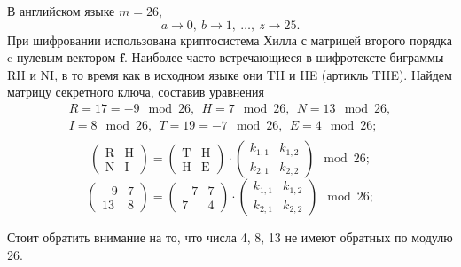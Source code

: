 \example В английском языке $m = 26$,
    \[ a \rightarrow 0, ~ b \rightarrow 1, ~ \dots, ~ z \rightarrow 25. \]
При шифровании использована криптосистема Хилла с матрицей второго порядка c нулевым вектором $\mathbf{f}$. Наиболее часто встречающиеся в шифротексте биграммы -- RH и NI, в то время как в исходном языке они TH и HE (артикль THE). Найдем матрицу секретного ключа, составив уравнения
\[
    \begin{array}{l}
        R = 17 = -9 \mod 26, ~~ H = 7 \mod 26, ~~ N = 13 \mod 26, \\
        I = 8 \mod 26, ~~ T = 19 = -7 \mod 26, ~~ E=4 \mod 26; \\
    \end{array}
\] \[
    \left( \begin{array}{cc}
        \text{R} & \text{H} \\
        \text{N} & \text{I}
    \end{array} \right) =
    \left( \begin{array}{cc}
        \text{T} & \text{H} \\
        \text{H} & \text{E}
    \end{array} \right) \cdot
    \left( \begin{array}{cc}
        k_{1,1} & k_{1,2} \\
        k_{2,1} & k_{2,2}
    \end{array} \right) \mod 26;
\] \[
    \left( \begin{array}{cc}
        -9 & 7 \\
        13 & 8
    \end{array} \right) =
    \left( \begin{array}{cc}
        -7 & 7 \\
        7 & 4
    \end{array} \right) \cdot
    \left( \begin{array}{cc}
        k_{1,1} & k_{1,2} \\
        k_{2,1} & k_{2,2}
    \end{array} \right) \mod 26;
\]

Стоит обратить внимание на то, что числа 4, 8, 13 не имеют обратных по модулю 26.

